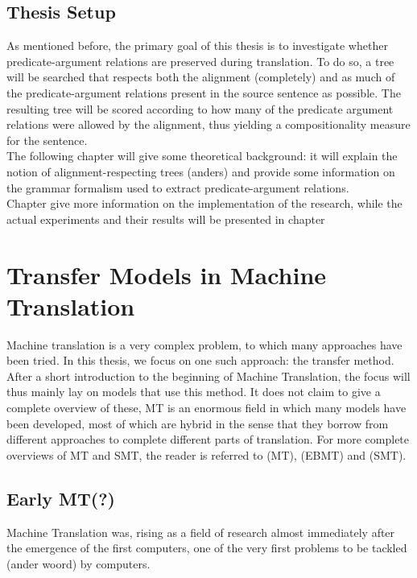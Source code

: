 \documentclass{report}
\theoremstyle{definition}
\theoremstyle{plain}
\begin{document}
\section*{Thesis Setup}

As mentioned before, the primary goal of this thesis is to investigate whether predicate-argument relations are preserved during translation. To do so, a tree will be searched that respects both the alignment (completely) and as much of the predicate-argument relations present in the source sentence as possible. The resulting tree will be scored according to how many of the predicate argument relations were allowed by the alignment, thus yielding a compositionality measure for the sentence.\\
The following chapter will give some theoretical background: it will explain the notion of alignment-respecting trees (anders) and provide some information on the grammar formalism used to extract predicate-argument relations.\\
Chapter give more information on the implementation of the research, while the actual experiments and their results will be presented in chapter 


\chapter{Transfer Models in Machine Translation}

Machine translation is a very complex problem, to which many approaches have been tried. In this thesis, we focus on one such approach: the transfer method.   After a short introduction to the beginning of Machine Translation, the focus will thus mainly lay on models that use this method. It does not claim to give a complete overview of these, MT is an enormous field in which many models have been developed, most of which are hybrid in the sense that they borrow from different approaches to complete different parts of translation. For more complete overviews of MT and SMT, the reader is referred to \cite{hutchins1992introduction} (MT), \cite{somers1999review} (EBMT) and \cite{koehn2008statistical} (SMT).


\section{Early MT(?)}
Machine Translation was, rising as a field of research almost immediately after the emergence of the first computers, one of the very first problems to be tackled (ander woord) by computers.
\end{document}
